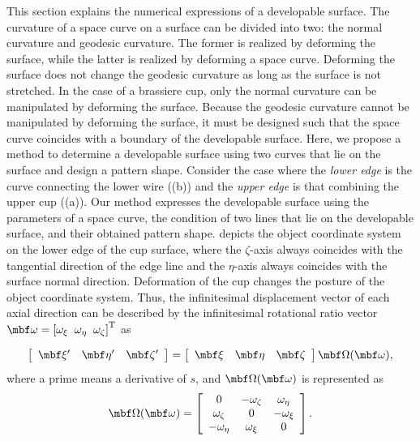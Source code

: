 \documentclass[E]{scitrans}
\begin{document}
This section explains the numerical expressions of a developable surface. The curvature of a space curve on a surface can be divided into two: the normal curvature and geodesic curvature. The former is realized by deforming the surface, while the latter is realized by deforming a space curve. Deforming the surface does not change the geodesic curvature as long as the surface is not stretched. In the case of a brassiere cup, only the normal curvature can be manipulated by deforming the surface. Because the geodesic curvature cannot be manipulated by deforming the surface, it must be designed such that the space curve coincides with a boundary of the developable surface. 
Here, we propose a method to determine a developable surface using two curves that lie on the surface and design a pattern shape. Consider the case where the \textit{lower edge} is the curve connecting the lower wire ((b)) and the \textit{upper edge} is that combining the upper cup ((a)). Our method expresses the developable surface using the parameters of a space curve, the condition of two lines that lie on the developable surface, and their obtained pattern shape.  depicts the object coordinate system on the lower edge of the cup surface, where the $\zeta$-axis always coincides with the tangential direction of the edge line and the  $ \eta $-axis always coincides with the surface normal direction. Deformation of the cup changes the posture of the object coordinate system. Thus, the infinitesimal displacement vector of each axial direction can be described by the infinitesimal rotational ratio vector $ \mbold{\omega} = \left[\omega_{\xi}\;\;\omega_{\eta}\;\;\omega_{\zeta}\right]^{\mathrm{T}}$ as

\begin{equation}\label{eq:ObjSys}
\left[\begin{array}{ccc} \xivec' & \etavec' & \zetavec' \end{array}\right] = \left[\begin{array}{ccc} \xivec & \etavec & \zetavec \end{array} \right] \mbold{\Omega}(\mbold{\omega}), 
\end{equation}
where a prime means a derivative of $s$, and $\mbold{\Omega}(\mbold{\omega})$ is represented as
\begin{equation}
\mbold{\Omega}(\mbold{\omega}) = \left[\begin{array}{ccc}
0 &-\omega_{\zeta} & \omega_{\eta} \\
\omega_{\zeta} & 0 &-\omega_{\xi} \\
-\omega_{\eta} & \omega_{\xi} &0
\end{array}\right]. 
\end{equation}
\end{document}
